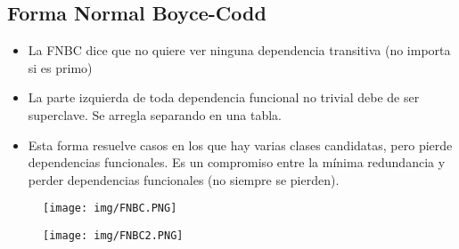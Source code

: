 \subsection*{Forma Normal Boyce-Codd}
\begin{itemize}
\item La FNBC dice que no quiere ver ninguna dependencia transitiva (no importa si es primo)
\item La parte izquierda de toda dependencia funcional no trivial debe de ser superclave. Se arregla separando en una tabla.
\item Esta forma resuelve casos en los que hay varias clases candidatas, pero pierde dependencias funcionales. Es un compromiso entre la mínima redundancia y perder dependencias funcionales (no siempre se pierden).
\end{itemize}

\begin{figure}[!htb]
    \centering
    \texttt{[image: img/FNBC.PNG]}
\end{figure}

\begin{figure}[!htb]
    \centering
    \texttt{[image: img/FNBC2.PNG]}
\end{figure}

\newpage